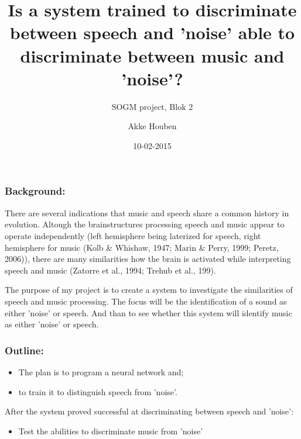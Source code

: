 \documentclass{beamer}
\title{Is a system trained to discriminate between speech and 'noise' able to discriminate between music and 'noise'?}
\subtitle{SOGM project, Blok 2}
\author{Akke Houben}
\date{10-02-2015}
\begin{document}
\begin{frame}
    \titlepage
\end{frame}

\begin{frame}   %
    \frametitle{Background:} 
    There are several indications that music and speech share a common history in evolution. Altough the brainstructures processing speech and music appear to operate independently (left hemisphere being laterized for speech, right hemisphere for music (Kolb \& Whishaw, 1947; Marin \& Perry, 1999; Peretz, 2006)), there are many similarities how the brain is activated while interpreting speech and music (Zatorre et al., 1994; Trehub et al., 199).

The purpose of my project is to create a system to investigate the similarities of speech and music processing. The focus will be the identification of a sound as either 'noise' or speech. And than to see whether this system will identify music as either 'noise' or speech.
\end{frame}     %


\begin{frame}   %
    \frametitle{Outline:}
    \begin{itemize}
        \item The plan is to program a neural network and;
        \item to train it to distinguish speech from 'noise'.
    \end{itemize}
    After the system proved successful at discriminating between speech and 'noise':
    \begin{itemize}
        \item Test the abilities to discriminate music from 'noise'
    \end{itemize}
\end{frame}     %
\end{document}
